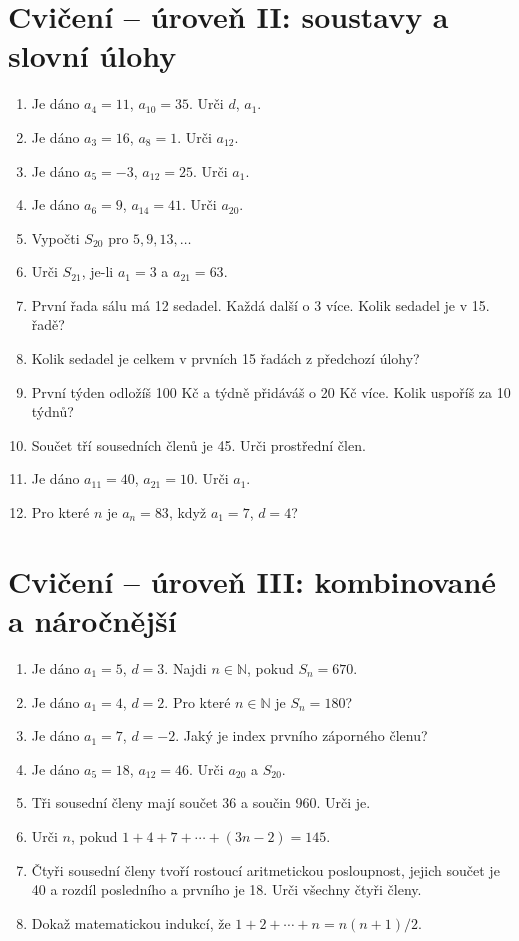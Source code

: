 \documentclass[11pt,a4paper]{article}
\begin{document}
\section{Cvičení -- úroveň II: soustavy a slovní úlohy}
\begin{enumerate}[label=\textbf{II.\arabic*}]
\item Je dáno $a_4=11$, $a_{10}=35$. Urči $d$, $a_1$.
\item Je dáno $a_3=16$, $a_8=1$. Urči $a_{12}$.
\item Je dáno $a_5=-3$, $a_{12}=25$. Urči $a_1$.
\item Je dáno $a_6=9$, $a_{14}=41$. Urči $a_{20}$.
\item Vypočti $S_{20}$ pro $5,9,13,\ldots$
\item Urči $S_{21}$, je-li $a_1=3$ a $a_{21}=63$.
\item První řada sálu má 12 sedadel. Každá další o 3 více. Kolik sedadel je v 15. řadě?
\item Kolik sedadel je celkem v prvních 15 řadách z předchozí úlohy?
\item První týden odložíš 100 Kč a týdně přidáváš o 20 Kč více. Kolik uspoříš za 10 týdnů?
\item Součet tří sousedních členů je 45. Urči prostřední člen.
\item Je dáno $a_{11}=40$, $a_{21}=10$. Urči $a_1$.
\item Pro které $n$ je $a_n=83$, když $a_1=7$, $d=4$?
\end{enumerate}

\section{Cvičení -- úroveň III: kombinované a náročnější}
\begin{enumerate}[label=\textbf{III.\arabic*}]
\item Je dáno $a_1=5$, $d=3$. Najdi $n\in\mathbb N$, pokud $S_n=670$.
\item Je dáno $a_1=4$, $d=2$. Pro které $n\in\mathbb N$ je $S_n=180$?
\item Je dáno $a_1=7$, $d=-2$. Jaký je index prvního záporného členu?
\item Je dáno $a_5=18$, $a_{12}=46$. Urči $a_{20}$ a $S_{20}$.
\item Tři sousední členy mají součet 36 a součin 960. Urči je.
\item Urči $n$, pokud $1+4+7+\cdots+(3n-2)=145$.
\item Čtyři sousední členy tvoří rostoucí aritmetickou posloupnost, jejich součet je 40 a rozdíl posledního a prvního je 18. Urči všechny čtyři členy.
\item Dokaž matematickou indukcí, že $1+2+\cdots+n=n(n+1)/2$.
\end{enumerate}
\end{document}
